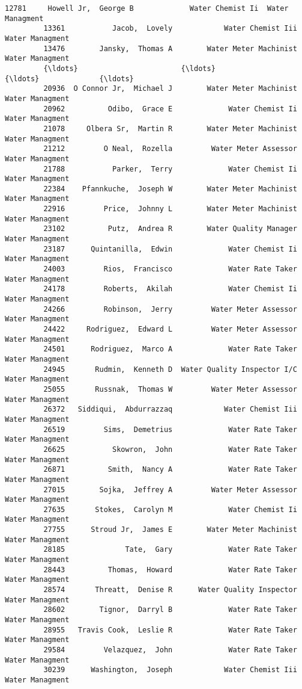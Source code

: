 \documentclass[11pt]{article}
\begin{document}
\begin{Verbatim}[commandchars=\\\{\}]
         12781     Howell Jr,  George B             Water Chemist Ii  Water Managment   
         13361           Jacob,  Lovely            Water Chemist Iii  Water Managment   
         13476        Jansky,  Thomas A        Water Meter Machinist  Water Managment   
         {\ldots}                        {\ldots}                          {\ldots}              {\ldots}   
         20936  O Connor Jr,  Michael J        Water Meter Machinist  Water Managment   
         20962          Odibo,  Grace E             Water Chemist Ii  Water Managment   
         21078     Olbera Sr,  Martin R        Water Meter Machinist  Water Managment   
         21212         O Neal,  Rozella         Water Meter Assessor  Water Managment   
         21788           Parker,  Terry             Water Chemist Ii  Water Managment   
         22384    Pfannkuche,  Joseph W        Water Meter Machinist  Water Managment   
         22916         Price,  Johnny L        Water Meter Machinist  Water Managment   
         23102          Putz,  Andrea R        Water Quality Manager  Water Managment   
         23187      Quintanilla,  Edwin             Water Chemist Ii  Water Managment   
         24003         Rios,  Francisco             Water Rate Taker  Water Managment   
         24178         Roberts,  Akilah             Water Chemist Ii  Water Managment   
         24266         Robinson,  Jerry         Water Meter Assessor  Water Managment   
         24422     Rodriguez,  Edward L         Water Meter Assessor  Water Managment   
         24501      Rodriguez,  Marco A             Water Rate Taker  Water Managment   
         24945       Rudmin,  Kenneth D  Water Quality Inspector I/C  Water Managment   
         25055       Russnak,  Thomas W         Water Meter Assessor  Water Managment   
         26372   Siddiqui,  Abdurrazzaq            Water Chemist Iii  Water Managment   
         26519         Sims,  Demetrius             Water Rate Taker  Water Managment   
         26625           Skowron,  John             Water Rate Taker  Water Managment   
         26871          Smith,  Nancy A             Water Rate Taker  Water Managment   
         27015        Sojka,  Jeffrey A         Water Meter Assessor  Water Managment   
         27635       Stokes,  Carolyn M             Water Chemist Ii  Water Managment   
         27755      Stroud Jr,  James E        Water Meter Machinist  Water Managment   
         28185              Tate,  Gary             Water Rate Taker  Water Managment   
         28443          Thomas,  Howard             Water Rate Taker  Water Managment   
         28574       Threatt,  Denise R      Water Quality Inspector  Water Managment   
         28602        Tignor,  Darryl B             Water Rate Taker  Water Managment   
         28955   Travis Cook,  Leslie R             Water Rate Taker  Water Managment   
         29584         Velazquez,  John             Water Rate Taker  Water Managment   
         30239      Washington,  Joseph            Water Chemist Iii  Water Managment   
         

\end{Verbatim}
\end{document}
